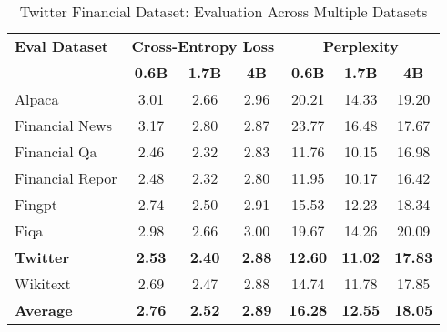 
\begin{table}[h]
\centering
\caption[Twitter Financial: Evaluation Results]{Twitter Financial Dataset: Evaluation Across Multiple Datasets}
\label{tab:twitter_results}
\begin{tabular}{l|ccc|ccc}
\hline
\textbf{Eval Dataset} & \multicolumn{3}{c|}{\textbf{Cross-Entropy Loss}} & \multicolumn{3}{c}{\textbf{Perplexity}} \\
\cline{2-4} \cline{5-7}
  & \textbf{0.6B} & \textbf{1.7B} & \textbf{4B} & \textbf{0.6B} & \textbf{1.7B} & \textbf{4B} \\
Alpaca & 3.01 & 2.66 & 2.96 & 20.21 & 14.33 & 19.20 \\
Financial News & 3.17 & 2.80 & 2.87 & 23.77 & 16.48 & 17.67 \\
Financial Qa & 2.46 & 2.32 & 2.83 & 11.76 & 10.15 & 16.98 \\
Financial Repor & 2.48 & 2.32 & 2.80 & 11.95 & 10.17 & 16.42 \\
Fingpt & 2.74 & 2.50 & 2.91 & 15.53 & 12.23 & 18.34 \\
Fiqa & 2.98 & 2.66 & 3.00 & 19.67 & 14.26 & 20.09 \\
\textbf{Twitter} & \textbf{2.53} & \textbf{2.40} & \textbf{2.88} & \textbf{12.60} & \textbf{11.02} & \textbf{17.83} \\
Wikitext & 2.69 & 2.47 & 2.88 & 14.74 & 11.78 & 17.85 \\
\hline
\textbf{Average} & \textbf{2.76} & \textbf{2.52} & \textbf{2.89} & \textbf{16.28} & \textbf{12.55} & \textbf{18.05} \\
\hline
\end{tabular}
\end{table}

